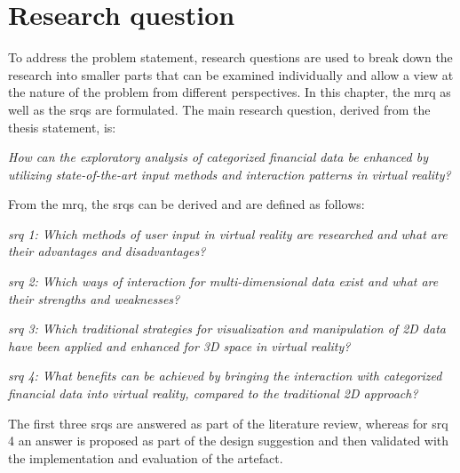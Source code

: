 \section{Research question}

\newcommand{\mrqtext}{How can the exploratory analysis of categorized financial data be enhanced by utilizing state-of-the-art input methods and interaction patterns in virtual reality?}

\newcommand{\srqonetext}{Which methods of user input in virtual reality are researched and what are their advantages and disadvantages?}
\newcommand{\srqtwotext}{Which ways of interaction for multi-dimensional data exist and what are their strengths and weaknesses?}
\newcommand{\srqthreetext}{Which traditional strategies for visualization and manipulation of 2D data have been applied and enhanced for 3D space in virtual reality?}
\newcommand{\srqfourtext}{What benefits can be achieved by bringing the interaction with categorized financial data into virtual reality, compared to the traditional 2D approach?}

To address the problem statement, research questions are used to break down the research into smaller parts that can be examined individually and allow a view at the nature of the problem from different perspectives. In this chapter, the \gls{mrq} as well as the \glspl{srq} are formulated. \newline
The main research question, derived from the thesis statement, is:
\begin{framed}
	\textit{\mrqtext}
\end{framed} \label{MRQ}
From the \gls{mrq}, the \glspl{srq} can be derived and are defined as follows:
\begin{framed}
	\textit{\gls{srq} 1: \srqonetext}
\end{framed} \label{SRQ1}
\begin{framed}
	\textit{\gls{srq} 2: \srqtwotext}
\end{framed} \label{SRQ2}
\begin{framed}
	\textit{\gls{srq} 3: \srqthreetext}
\end{framed} \label{SRQ3}
 \begin{framed}
 	\textit{\gls{srq} 4: \srqfourtext}
 \end{framed} \label{SRQ4}
The first three \glspl{srq} are answered as part of the literature review, whereas for \gls{srq} 4 an answer is proposed as part of the design suggestion and then validated with the implementation and evaluation of the artefact.


